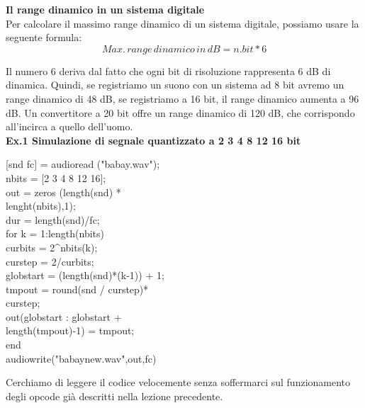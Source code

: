 \documentclass[11pt]{article}
\begin{document}
\begin{multicols*}{2}
\textbf{\textsf {Il range dinamico in un sistema digitale}}\\

Per calcolare il massimo range dinamico di un sistema digitale, possiamo usare la seguente formula:
\[
Max.\, range\, dinamico\, in\, dB = n. bit * 6
\]

Il numero 6 deriva dal fatto che ogni bit di risoluzione rappresenta 6 dB di dinamica. Quindi, se registriamo un suono con un sistema ad 8 bit avremo un range dinamico di 48 dB, se registriamo a 16 bit, il range dinamico aumenta a 96 dB. Un convertitore a 20 bit offre un range dinamico di 120 dB, che corrispondo all’incirca a quello dell’uomo.\\

\textbf{\textsf {Ex.1 Simulazione di segnale quantizzato a 2 3 4 8 12 16 bit}}\\

\begin{center}
\begin{minipage}[c]{6.3cm}
\begin{sffamily}

[snd fc] = audioread ("babay.wav");\\
nbits = [2 3 4 8 12 16];\\
out = zeros (length(snd) * \\
lenght(nbits),1);\\
dur = length(snd)/fc;\\

for k = 1:length(nbits)\\
curbits = 2\textasciicircum nbits(k);\\
curstep = 2/curbits;\\
globstart = (length(snd)*(k-1)) + 1;\\
tmpout = round(snd / curstep)*\\
curstep;\\
out(globstart : globstart + \\
length(tmpout)-1) = tmpout;\\
end\\
audiowrite("babaynew.wav",out,fc)\\

\end{sffamily}
\end{minipage}
\end{center}

\noindent Cerchiamo di leggere il codice velocemente senza soffermarci sul funzionamento degli opcode già descritti nella lezione precedente. 


\end{multicols*}
\end{document}
